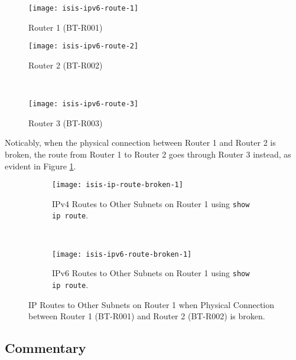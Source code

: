 \begin{figure*}[ht!]
    \centering
    \begin{subfigure}[b]{0.67\textwidth}
        \centering
        \texttt{[image: isis-ipv6-route-1]}
        \caption{Router 1 (BT-R001)}
    \end{subfigure}
    \hfill
    \begin{minipage}[b]{0.3\textwidth}
	    \begin{subfigure}[b]{\linewidth}
	        \centering
	        \texttt{[image: isis-ipv6-route-2]}
	        \caption{Router 2 (BT-R002)}
	    \end{subfigure}
	    \\
	    \begin{subfigure}[b]{\linewidth}
	        \centering
	        \texttt{[image: isis-ipv6-route-3]}
	        \caption{Router 3 (BT-R003)}
	    \end{subfigure}
	\end{minipage}
    \caption{IPv6 Routes to Other Subnets on All $3$ Routers Respectively using \texttt{show ipv6 route}.}
    \label{fig:isis-ipv6-route}
\end{figure*}

\clearpage

Noticably, when the physical connection between Router 1 and Router 2 is broken, the route from Router 1 to Router 2 goes through Router 3 instead, as evident in Figure \ref{fig:isis-ip-route-broken}.

\begin{figure}[ht!]
    \centering    
    \begin{subfigure}[b]{\textwidth}
        \centering
        \texttt{[image: isis-ip-route-broken-1]}
        \caption{IPv4 Routes to Other Subnets on Router 1 using \texttt{show ip route}.}
    \end{subfigure}
    ~
    \begin{subfigure}[b]{\textwidth}
        \centering
        \texttt{[image: isis-ipv6-route-broken-1]}
        \caption{IPv6 Routes to Other Subnets on Router 1 using \texttt{show ip route}.}
    \end{subfigure}
    \caption{IP Routes to Other Subnets on Router 1 when Physical Connection between Router 1 (BT-R001) and Router 2 (BT-R002) is broken.}
    \label{fig:isis-ip-route-broken}
\end{figure}

\subsection{Commentary}


